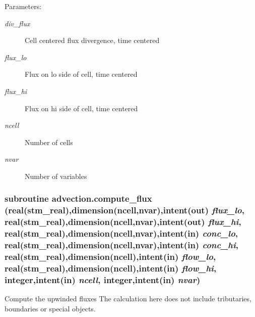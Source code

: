 \begin{Desc}
\item[Parameters:]
\begin{description}
\item[{\em div\_\-flux}]Cell centered flux divergence, time centered\item[{\em flux\_\-lo}]Flux on lo side of cell, time centered\item[{\em flux\_\-hi}]Flux on hi side of cell, time centered \item[{\em ncell}]Number of cells\item[{\em nvar}]Number of variables \end{description}
\end{Desc}
\hypertarget{a00049_3947a8a29b1c666b2d1b7223215e9873}{
\subsubsection[{compute\_\-flux}]{\setlength{\rightskip}{0pt plus 5cm}subroutine advection.compute\_\-flux (real(stm\_\-real),dimension(ncell,nvar),intent(out) {\em flux\_\-lo}, \/  real(stm\_\-real),dimension(ncell,nvar),intent(out) {\em flux\_\-hi}, \/  real(stm\_\-real),dimension(ncell,nvar),intent(in) {\em conc\_\-lo}, \/  real(stm\_\-real),dimension(ncell,nvar),intent(in) {\em conc\_\-hi}, \/  real(stm\_\-real),dimension(ncell),intent(in) {\em flow\_\-lo}, \/  real(stm\_\-real),dimension(ncell),intent(in) {\em flow\_\-hi}, \/  integer,intent(in) {\em ncell}, \/  integer,intent(in) {\em nvar})}}
\label{a00049_3947a8a29b1c666b2d1b7223215e9873}


Compute the upwinded fluxes The calculation here does not include tributaries, boundaries or special objects. 

